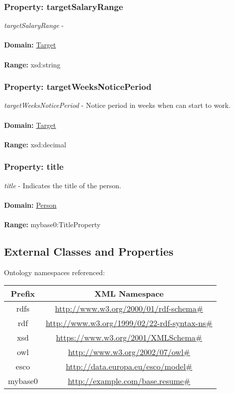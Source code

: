 \documentclass[a4paper,12pt]{article}
\numberwithin{equation}{section}
\begin{document}
\subsubsection{Property: targetSalaryRange}\hypertarget{targetSalaryRange}{}
\textit{targetSalaryRange} - 
\\\\
\textbf{Domain:} \hyperlink{Target}{Target} 
\\\\
\textbf{Range:}  xsd:string

\subsubsection{Property: targetWeeksNoticePeriod}\hypertarget{targetWeeksNoticePeriod}{}
\textit{targetWeeksNoticePeriod} - Notice period in weeks when can start to work.
\\\\
\textbf{Domain:} \hyperlink{Target}{Target} 
\\\\
\textbf{Range:}  xsd:decimal

\subsubsection{Property: title}\hypertarget{title}{}
\textit{title} - Indicates the title of the person.
\\\\
\textbf{Domain:} \hyperlink{Person}{Person} 
\\\\
\textbf{Range:}  mybase0:TitleProperty


\subsection{External Classes and Properties}
Ontology namespaces referenced:

\begin{tabular}{ | c | c  | } 
\hline
 \textbf{Prefix} & \textbf{XML Namespace}  \\ 
\hline
rdfs & \url{http://www.w3.org/2000/01/rdf-schema\#} \\ 
\hline
rdf & \url{http://www.w3.org/1999/02/22-rdf-syntax-ns\#}  \\ 
\hline
xsd & \url{https://www.w3.org/2001/XMLSchema\#}  \\ 
\hline
owl & \url{http://www.w3.org/2002/07/owl\#}  \\ 
\hline
esco & \url{http://data.europa.eu/esco/model\#}  \\ 
\hline
mybase0 & \url{http://example.com/base.resume\#}  \\ 
\hline
\end{tabular}
\end{document}
